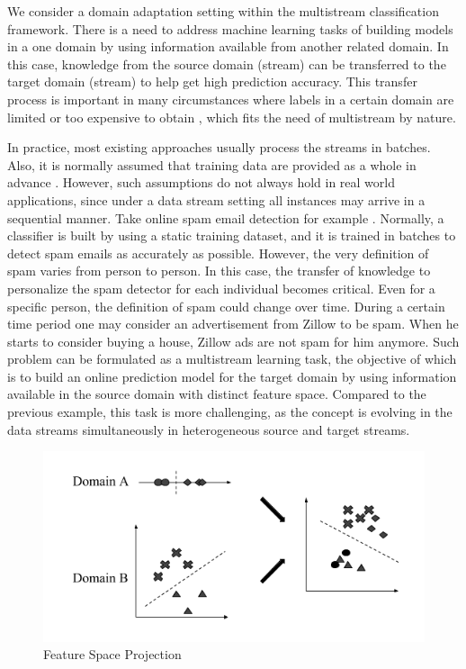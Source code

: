 We consider a domain adaptation setting within the multistream classification framework. There is a need to address machine learning tasks of building 
models in a one domain by using information available from another related domain. In
this case, knowledge from the source domain (stream) can be transferred to the target domain (stream) to
help get high prediction accuracy. This transfer process is important in many 
circumstances where labels in a certain domain are limited or too expensive to obtain \cite{arnold2007comparative, hoi2014libol}, which fits the need of multistream by nature.

In practice, most existing approaches usually process the streams in batches. Also, it is normally 
assumed that training data are provided as a whole in advance \cite{pan2010survey}. However, such assumptions
do not always hold in real world applications, since under a data stream setting 
all instances may arrive in a sequential manner. Take online spam email detection for example \cite{chen2015opinion}. 
Normally, a classifier is built by using a static training dataset, and it is trained in batches to
detect spam emails as accurately as possible. However, the very definition of spam varies from 
person to person. In this case, the transfer of knowledge to personalize the spam detector for each 
individual becomes critical. Even for a specific person, the definition of spam could change over time. During a certain
time period one may consider an advertisement from Zillow to be spam. When he starts to consider buying a house,
Zillow ads are not spam for him anymore. Such problem can be formulated as a multistream learning task, the 
objective of which is to build an online prediction model for the target domain by using information 
available in the source domain with distinct feature space. Compared to the previous example, this task 
is more challenging, as the concept is evolving in the data streams simultaneously in heterogeneous source and target streams.

\begin{figure}[t]
\centering
\includegraphics[width=0.8\columnwidth]{Figures/feature_projection.png}
\caption{Feature Space Projection}
\label{fig:featureprojection}
\end{figure}

